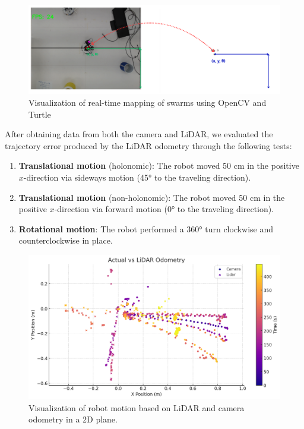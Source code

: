 \begin{figure}[H]
    \centering
    \includegraphics[width=1\linewidth]{assets/images/odometry/mapping.png}
    \caption{Visualization of real-time mapping of swarms using OpenCV and Turtle}
    \label{fig:coor-mapping}
\end{figure}

\newpage
After obtaining data from both the camera and LiDAR, we evaluated the trajectory error produced by the LiDAR odometry through the following tests:

\begin{enumerate}
    \item \textbf{Translational motion} (holonomic): The robot moved 50 cm in the positive \(x\)-direction via sideways motion (45° to the traveling direction).
    \item \textbf{Translational motion} (non-holonomic): The robot moved 50 cm in the positive \(x\)-direction via forward motion (0° to the traveling direction).
    \item \textbf{Rotational motion}: The robot performed a 360° turn clockwise and counterclockwise in place.
\end{enumerate}


\begin{figure}[H]
    \centering
    \includegraphics[width=0.7\linewidth]{assets/images/odometry/testing_visual.png}
    \caption{Visualization of robot motion based on LiDAR and camera odometry in a 2D plane.}
    \label{fig:visual-result}
\end{figure}

